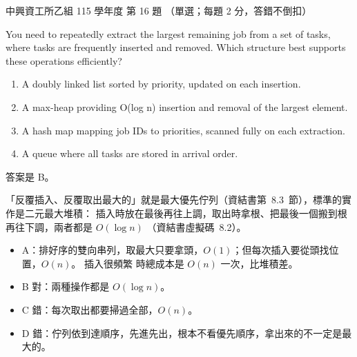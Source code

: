 \begin{pastexam}[label={px:nchu-115-is-16}]{中興資工所乙組 115 學年度 第 16 題}
（單選；每題 2 分，答錯不倒扣）

You need to repeatedly extract the largest remaining job from a set of tasks, where tasks are
frequently inserted and removed. Which structure best supports these operations efficiently?
\begin{enumerate}[label=\Alph*.,nosep]
\item A doubly linked list sorted by priority, updated on each insertion.
\item A max-heap providing O(log n) insertion and removal of the largest element.
\item A hash map mapping job IDs to priorities, scanned fully on each extraction.
\item A queue where all tasks are stored in arrival order.
\end{enumerate}
\end{pastexam}

\begin{pastsoln}
答案是 B。

「反覆插入、反覆取出最大的」就是最大優先佇列（資結書第~8.3~節），標準的實作是二元最大堆積：
插入時放在最後再往上調，取出時拿根、把最後一個搬到根再往下調，兩者都是 $O(\log n)$
（資結書虛擬碼~8.2）。
\begin{itemize}
\item A：排好序的雙向串列，取最大只要拿頭，$O(1)$；但每次插入要從頭找位置，$O(n)$。 插入很頻繁
時總成本是 $O(n)$ 一次，比堆積差。
\item B 對：兩種操作都是 $O(\log n)$。
\item C 錯：每次取出都要掃過全部，$O(n)$。
\item D 錯：佇列依到達順序，先進先出，根本不看優先順序，拿出來的不一定是最大的。
\end{itemize}
\end{pastsoln}
